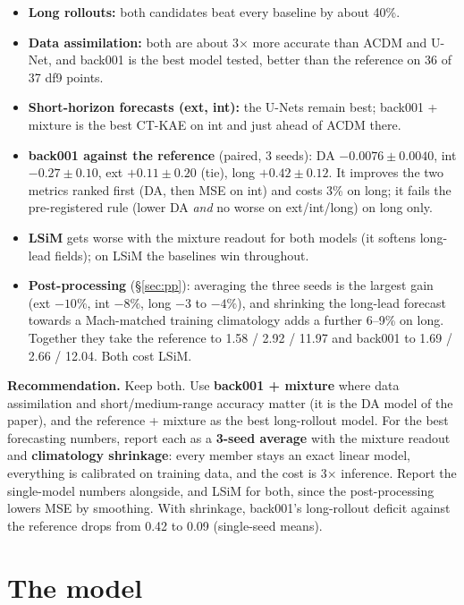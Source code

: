 \documentclass[10.5pt,a4paper]{article}
\newcommand{\callout}[1]{\par\smallskip\noindent\colorbox{note}{\parbox{\dimexpr\linewidth-2\fboxsep}{\small #1}}\par\smallskip}
\begin{document}
\begin{itemize}
\item \textbf{Long rollouts:} both candidates beat every baseline by about 40\%.
\item \textbf{Data assimilation:} both are about 3$\times$ more accurate than ACDM and U-Net, and
  back001 is the best model tested, better than the reference on 36 of 37 df9 points.
\item \textbf{Short-horizon forecasts (ext, int):} the U-Nets remain best; back001 + mixture is
  the best CT-KAE on int and just ahead of ACDM there.
\item \textbf{back001 against the reference} (paired, 3 seeds): DA $-0.0076\pm0.0040$, int
  $-0.27\pm0.10$, ext $+0.11\pm0.20$ (tie), long $+0.42\pm0.12$. It improves the two metrics
  ranked first (DA, then MSE on int) and costs 3\% on long; it fails the pre-registered
  rule (lower DA \emph{and} no worse on ext/int/long) on long only.
\item \textbf{LSiM} gets worse with the mixture readout for both models (it softens long-lead
  fields); on LSiM the baselines win throughout.
\item \textbf{Post-processing} (\S\ref{sec:pp}): averaging the three seeds is the largest gain
  (ext $-10\%$, int $-8\%$, long $-3$ to $-4\%$), and shrinking the long-lead forecast towards a
  Mach-matched training climatology adds a further 6--9\% on long. Together they take the
  reference to 1.58 / 2.92 / 11.97 and back001 to 1.69 / 2.66 / 12.04. Both cost LSiM.
\end{itemize}

\callout{\textbf{Recommendation.} Keep both. Use \textbf{back001 + mixture} where data
assimilation and short/medium-range accuracy matter (it is the DA model of the paper), and the
reference + mixture as the best long-rollout model. For the best forecasting numbers, report each
as a \textbf{3-seed average} with the mixture readout and \textbf{climatology shrinkage}: every
member stays an exact linear model, everything is calibrated on training data, and the cost is
3$\times$ inference. Report the single-model numbers alongside, and LSiM for both, since the
post-processing lowers MSE by smoothing. With shrinkage, back001's long-rollout deficit against
the reference drops from 0.42 to 0.09 (single-seed means).}

\tableofcontents

\section{The model}\label{sec:model}
\end{document}
